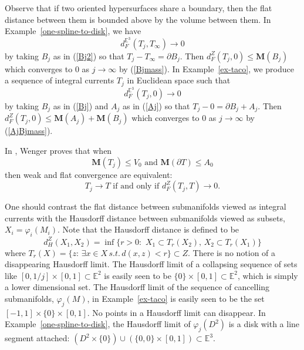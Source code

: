 \documentclass[12pt]{amsart}
\begin{document}
Observe that if two oriented hypersurfaces share a boundary, then the flat distance between them is
bounded above by the volume between them.  In Example~\ref{one-spline-to-disk}, we have
\begin{equation}
d_F^{{\mathbb{E}}^3}(T_j, T_\infty) \to 0
\end{equation}
by taking $B_j$ as in (\ref{Bj2}) 
so that $T_j-T_\infty=\partial B_j $.  Then
$d_F^Z(T_j , 0) \le {{\mathbf M}}(B_j)$
which converges to $0$ as $j \to \infty$ by (\ref{Bjmass}).
In Example~\ref{ex-taco}, we
produce a sequence of integral currents $T_j$ in Euclidean space such that
\begin{equation}
d_F^{{\mathbb{E}}^3}(T_j, 0) \to 0
\end{equation}
by taking $B_j$ as in (\ref{Bj}) and $A_j$ as in (\ref{Aj})
so that $T_j-0=\partial B_j + A_j$.  Then
$d_F^Z(T_j , 0) \le {{\mathbf M}}(A_j) +{{\mathbf M}}(B_j)$
which converges to $0$ as $j \to \infty$ by (\ref{AjBjmass}).

In \cite{Wenger-flat}, Wenger proves that
when
\begin{equation}
{{\mathbf M}}(T_j)\le V_0
\textrm{ and }
{{\mathbf M}}(\partial T) \le A_0
\end{equation}
then weak and flat convergence are equivalent:
\begin{equation} \label{F=weak}
T_j {\to} T
\textrm{ if and only if }
d_F^Z(T_j, T) \to 0. 
\end{equation}

One should contrast the flat distance between submanifolds
viewed as integral currents with the Hausdorff distance between
submanifolds viewed as subsets, $X_i=\varphi_i(M_i)$.  Note
that the Hausdorff distance is defined to be
\begin{equation} \label{Hausdorff}
d_H^Z(X_1, X_2) =
\inf\{ r>0: \,\, X_1\subset T_r(X_2),\,
 X_2 \subset T_r(X_1)\}
 \end{equation}
 where $T_r(X)= \{z:\, \exists x \in X \, s.t.\, d(x,z)<r\}\subset Z$.
There is no notion of
 a disappearing Hausdorff limit.  The Hausdorff limit of a collapsing 
 sequence of sets like $[0,1/j]\times [0,1] \subset \mathbb{E}^2$
 is easily seen to be $\{0\}\times [0,1] \subset \mathbb{E}^2$, which 
 is simply a lower dimensional set.   The Hausdorff limit of
 the sequence of cancelling submanifolds, $\varphi_j(M)$, in 
 Example~\ref{ex-taco} 
 is easily seen to be the set $[-1,1]\times\{0\}\times [0,1]$.   
No points in a Hausdorff limit can disappear.   In Example~\ref{one-spline-to-disk}, 
the Hausdorff limit of $\varphi_j(D^2)$ is 
a disk with a line segment attached:
$
(D^2\times \{0\}) \cup (\{0,0\}\times [0,1]) \subset {\mathbb{E}}^3.
$
\end{document}
